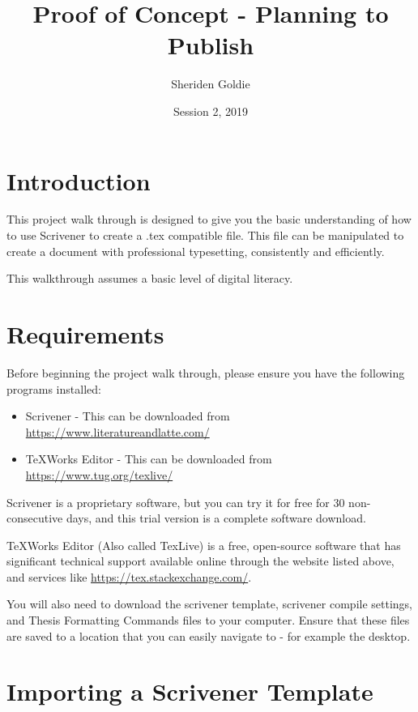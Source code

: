 \documentclass{article}
\title{Proof of Concept - Planning to Publish}
\author{Sheriden Goldie}
\date{Session 2, 2019}
\begin{document}
\maketitle

\tableofcontents

\pagebreak

\section{Introduction}

This project walk through is designed to give you the basic understanding of how to use Scrivener to create a .tex compatible file. This file can be manipulated to create a document with professional typesetting, consistently and efficiently. 

This walkthrough assumes a basic level of digital literacy.

\section{Requirements}

Before beginning the project walk through, please ensure you have the following programs installed:

\begin{itemize}
    \item Scrivener - This can be downloaded from \url{https://www.literatureandlatte.com/}
    \item TeXWorks Editor - This can be downloaded from \url{https://www.tug.org/texlive/}
\end{itemize}

Scrivener is a proprietary software, but you can try it for free for 30 non-consecutive days, and this trial version is a complete software download. 

TeXWorks Editor (Also called TexLive) is a free, open-source software that has significant technical support available online through the website listed above, and services like \url{https://tex.stackexchange.com/}.

You will also need to download the scrivener template, scrivener compile settings, and Thesis Formatting Commands files to your computer. Ensure that these files are saved to a location that you can easily navigate to - for example the desktop.


\section{Importing a Scrivener Template}
\end{document}
